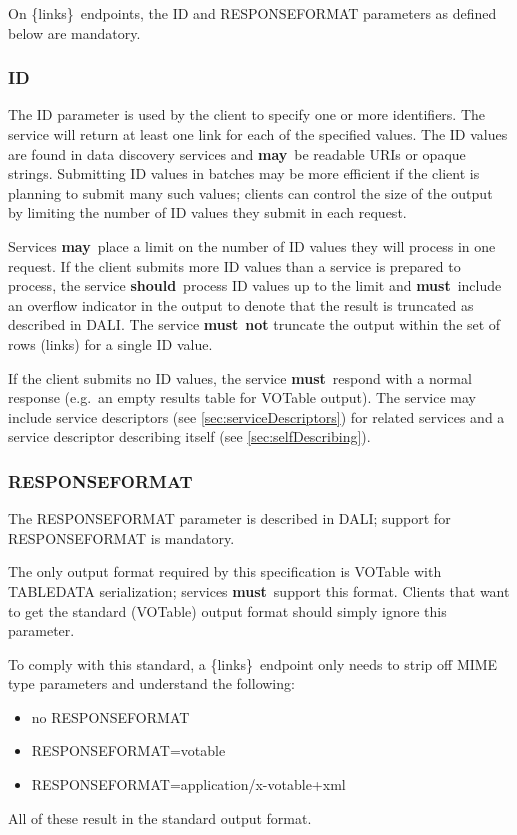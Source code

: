 \documentclass[11pt,a4paper]{ivoa}
\newcommand{\blinks}{\{links\}}
\newcommand{\rfcmust}{\textbf{must}}
\newcommand{\rfcshould}{\textbf{should}}
\newcommand{\rfcmay}{\textbf{may}}
\begin{document}
On \blinks\ endpoints, the ID and RESPONSEFORMAT parameters as defined
below are mandatory.


\subsubsection{ID}
\label{sec:resourceId}

The ID parameter is used by the client to specify one or more
identifiers. The service will return at least one link for each of the
specified values. The ID values are found in data discovery services
and \rfcmay\ be readable URIs or opaque strings. Submitting ID values in batches
may be more efficient if the client is planning to submit many such values;
clients can control the size of the output by limiting the number of ID values
they submit in each request.

Services \rfcmay\ place a limit on the number of ID values they will process in one
request. If the client submits more ID values than a service is prepared to
process, the service \rfcshould\ process ID values up to the limit and
\rfcmust\ include an overflow indicator in the output to denote that
the result is truncated as described in DALI.
The service \rfcmust\ \textbf{not} truncate the output within the set of rows
(links) for a single ID value.

If the client submits no ID values, the service \rfcmust\ respond with a
normal response (e.g.\ an empty results table for VOTable output).
The service may include service descriptors
(see \ref{sec:serviceDescriptors})
for related services and a service descriptor describing itself
(see \ref{sec:selfDescribing}).


\subsubsection{RESPONSEFORMAT}
\label{sec:responseformat}

The RESPONSEFORMAT parameter is described in DALI;
support for RESPONSEFORMAT is mandatory.

The only output format required by this specification is VOTable with
TABLEDATA serialization; services \rfcmust\ support this format. Clients
that want to get the standard (VOTable) output format should simply
ignore this parameter.

To comply with this standard, a \blinks\ endpoint only needs to strip
off MIME type parameters and understand the following:
\begin{itemize}
  \item no RESPONSEFORMAT
  \item RESPONSEFORMAT=votable
  \item RESPONSEFORMAT=application/x-votable+xml
\end{itemize}
All of these result in the standard output format.
\end{document}
